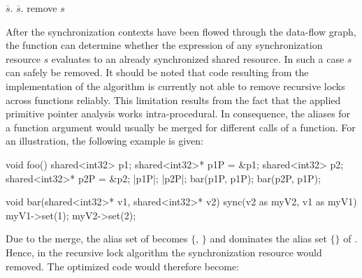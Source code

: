 \begin{algorithmic}
\State {}
 
      \State $\overline{s}.$ 
    \EndIf
  \EndFor
\EndFor
\Repeat {}
     
      \State $\overline{s}.$
    \EndIf
  \EndFor
{}
 
      \State remove $s$
  \EndIf
\EndFor
\EndFunction
\end{algorithmic}
After the synchronization contexts have been flowed through the data-flow graph, the function can determine whether the expression of any synchronization resource $s$ evaluates to an already synchronized shared resource. In such a case $s$ can safely be removed. It should be noted that code resulting from the implementation of the algorithm is currently not able to remove recursive locks across functions reliably. This limitation results from the fact that the applied primitive pointer analysis works intra-procedural. In consequence, the aliases for a function argument would usually be merged for different calls of a function. For an illustration, the following example is given:
\begin{ccode}
void foo() {
  shared<int32> p1; 
  shared<int32>* p1P = &p1; 
  shared<int32> p2; 
  shared<int32>* p2P = &p2;
  |p1P|; 
  |p2P|;
  bar(p1P, p1P);
  bar(p2P, p1P);
}

void bar(shared<int32>* v1, shared<int32>* v2) { 
  sync(v2 as myV2, v1 as myV1) { 
    myV1->set(1); 
    myV2->set(2); 
  } 
}
\end{ccode}
Due to the merge, the alias set of  becomes $\{$, $\}$ and dominates the alias set $\{$$\}$ of . Hence, in the recursive lock algorithm the synchronization resource  would removed. The optimized code would therefore become:
